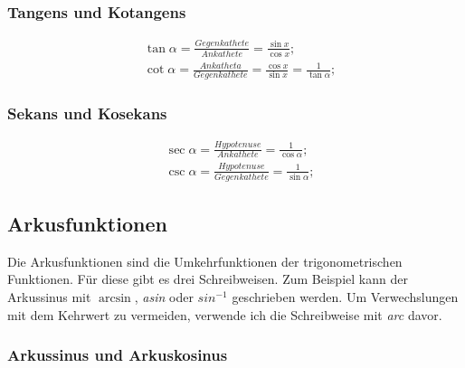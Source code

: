 \documentclass[a4paper]{article}
\begin{document}
\subsubsection{Tangens und Kotangens}
\begin{align*}
	&\tan{\alpha} = \frac{Gegenkathete}{Ankathete} = \frac{\sin{x}}{\cos{x}} ;
	\\
	&\cot{\alpha} = \frac{Ankatheta}{Gegenkathete} = \frac{\cos{x}}{\sin{x}} = \frac{1}{\tan{\alpha}} ;
\end{align*}

\subsubsection{Sekans und Kosekans}
\begin{align*}
	&\sec{\alpha} = \frac{Hypotenuse}{Ankathete} = \frac{1}{\cos{\alpha}} ;
	\\
	&\csc{\alpha} = \frac{Hypotenuse}{Gegenkathete} = \frac{1}{\sin{\alpha}} ;
\end{align*}

\subsection{Arkusfunktionen}
Die Arkusfunktionen sind die Umkehrfunktionen der trigonometrischen Funktionen.
F\"ur diese gibt es drei Schreibweisen.
Zum Beispiel kann der Arkussinus mit $ \arcsin $,
\textit{asin} oder $ sin^{-1} $ geschrieben werden.
Um Verwechslungen mit dem Kehrwert zu vermeiden,
verwende ich die Schreibweise mit \textit{arc} davor.

\subsubsection{Arkussinus und Arkuskosinus}
\end{document}
